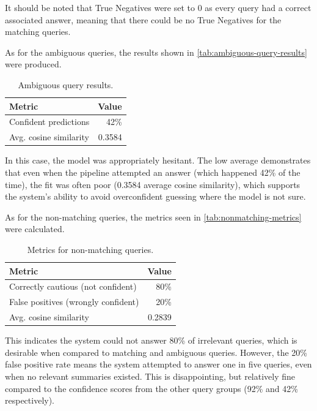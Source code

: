 \documentclass[11pt]{article}
\begin{document}
It should be noted that True Negatives were set to 0 as every query had a correct associated answer, meaning that there could be no True Negatives for the matching queries. 

As for the ambiguous queries, the results shown in \autoref{tab:ambiguous-query-results} were produced.

\begin{table}[t]
  \centering
  \begin{tabular}{l r}
    \textbf{Metric} & \textbf{Value} \\
    \hline
    Confident predictions & 42\% \\
    Avg. cosine similarity & 0.3584 \\
  \end{tabular}
  \caption{Ambiguous query results.}
  \label{tab:ambiguous-query-results}
\end{table}

In this case, the model was appropriately hesitant. The low average demonstrates that even when the pipeline attempted an answer (which happened 42\% of the time), the fit was often poor (0.3584 average cosine similarity), which supports the system's ability to avoid overconfident guessing where the model is not sure. 

As for the non-matching queries, the metrics seen in \autoref{tab:nonmatching-metrics} were calculated.

\begin{table}[t]
  \centering
  \begin{tabular}{l r}
    \textbf{Metric} & \textbf{Value} \\
    \hline
    Correctly cautious (not confident) & 80\% \\
    False positives (wrongly confident) & 20\% \\
    Avg. cosine similarity & 0.2839 \\
  \end{tabular}
  \caption{Metrics for non-matching queries.}
  \label{tab:nonmatching-metrics}
\end{table}

This indicates the system could not answer 80\% of irrelevant queries, which is desirable when compared to matching and ambiguous queries. However, the 20\% false positive rate means the system attempted to answer one in five queries, even when no relevant summaries existed. This is disappointing, but relatively fine compared to the confidence scores from the other query groups (92\% and 42\% respectively).
\end{document}
